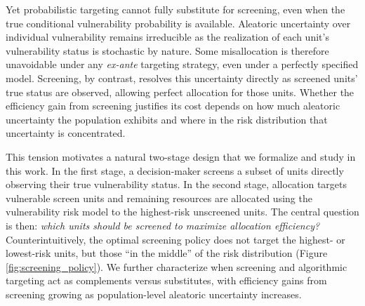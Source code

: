
Yet probabilistic targeting cannot fully substitute for screening, even when the true conditional vulnerability probability is available. Aleatoric uncertainty over individual vulnerability remains irreducible as the realization of each unit's vulnerability status is stochastic by nature. Some misallocation is therefore unavoidable under any \textit{ex-ante} targeting strategy, even under a perfectly specified model. Screening, by contrast, resolves this uncertainty directly as screened units' true status are observed, allowing perfect allocation for those units. Whether the efficiency gain from screening justifies its cost depends on how much aleatoric uncertainty the population exhibits and where in the risk distribution that uncertainty is concentrated.



This tension motivates a natural two-stage design that we formalize and study in this work. In the first stage, a decision-maker screens a subset of units directly observing their true vulnerability status. In the second stage, allocation targets vulnerable screen units and remaining resources are allocated using the vulnerability risk model to the highest-risk unscreened units. The central question is then: \textit{which units should be screened to maximize allocation efficiency?} Counterintuitively, the optimal screening policy does not target the highest- or lowest-risk units, but those ``in the middle'' of the risk distribution (Figure \ref{fig:screening_policy}). We further characterize when screening and algorithmic targeting act as complements versus substitutes, with efficiency gains from screening growing as population-level aleatoric uncertainty increases.



